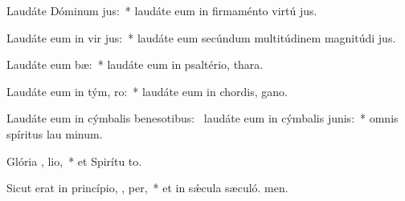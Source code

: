 \item Laudáte Dóminum   jus:~* laudáte eum in firmaménto virtú jus.
\item Laudáte eum in vir jus:~* laudáte eum secúndum multitúdinem magnitúdi jus.
\item Laudáte eum   bæ:~* laudáte eum in psaltério,  thara.
\item Laudáte eum in tým,  ro:~* laudáte eum in chordis,  gano.
\item Laudáte eum in cýmbalis benesotibus:~\pscross{} laudáte eum in cýmbalis junis:~* omnis spíritus lau minum.
\item Glória ,  lio,~* et Spirítu to.
\item Sicut erat in princípio,  ,  per,~* et in sǽcula sæculó. men.
